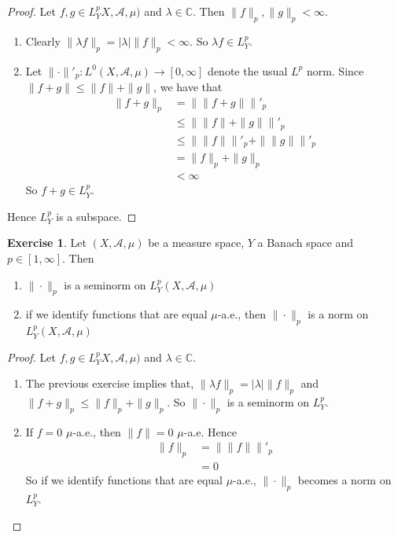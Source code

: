 \documentclass[12pt]{amsart}
\theoremstyle{definition}
\newtheorem{ex}[definition]{Exercise}
\newcommand{\lam}{\lambda}
\newcommand{\C}{\mathbb{C}}
\newcommand{\MA}{\mathcal{A}}
\newcommand{\RG}{[0,\infty]}
\newcommand{\lex}[1]{\label{ex:#1}}
\begin{document}
	\begin{proof}Let $f, g \in L^p_YX, \MA, \mu)$ and $\lam \in \C$. Then $\|f\|_p, \|g\|_p < \infty$.
	\begin{enumerate}
	\item Clearly $\|\lam f\|_p = |\lam|\|f\|_p < \infty$.
	So $\lam f \in L^p_Y$.
	\item Let $\|\cdot \|'_p: L^0(X, \MA, \mu) \rightarrow \RG$ denote the usual $L^p$ norm. Since $\|f + g\| \leq \|f\| + \|g\|$, we have that 
	\begin{align*}
	\|f+g\|_p 
	&= \| \|f+g\| \|'_p \\
	& \leq \|\|f\| + \|g\| \|'_p \\
	& \leq  \|\|f\| \|'_p + \|\|g\| \|'_p \\
	&= \|f \|_p + \|g\|_p \\
	& < \infty
\end{align*}	
So $f+g \in L^p_Y$.
	\end{enumerate}
	Hence $L^p_Y$ is a subspace.
	\end{proof}
	
	\begin{ex} \lex{00000} 
	Let $(X, \MA, \mu)$ be a measure space, $Y$ a Banach space and $p \in [1, \infty]$. Then 
	\begin{enumerate}
	\item $\|\cdot\|_p$ is a seminorm on $L^p_Y(X, \MA, \mu)$
	\item if we identify functions that are equal $\mu$-a.e., then $\|\cdot\|_p$ is a norm on $L^p_Y(X, \MA, \mu)$
	\end{enumerate}
	\end{ex}
	
	\begin{proof} 
	Let $f, g \in L^p_YX, \MA, \mu)$ and $\lam \in \C$. 
	\begin{enumerate}
	\item The previous exercise implies that, $\|\lam f\|_p = |\lam|\|f\|_p$ and $\|f+g\|_p \leq \|f\|_p + \|g \|_p$. So $\|\cdot\|_p$ is a seminorm on $L_Y^p$.
	\item If $f = 0$ $\mu$-a.e., then $\|f\| = 0$  $\mu$-a.e. Hence
	\begin{align*}
	\|f\|_p 
	&= \|\|f\|\|'_p \\
	&= 0
\end{align*}
	So if we identify functions that are equal $\mu$-a.e., $\|\cdot\|_p$ becomes a norm on $L^p_Y$. 	  
	\end{enumerate}
	\end{proof}
	
\end{document}
